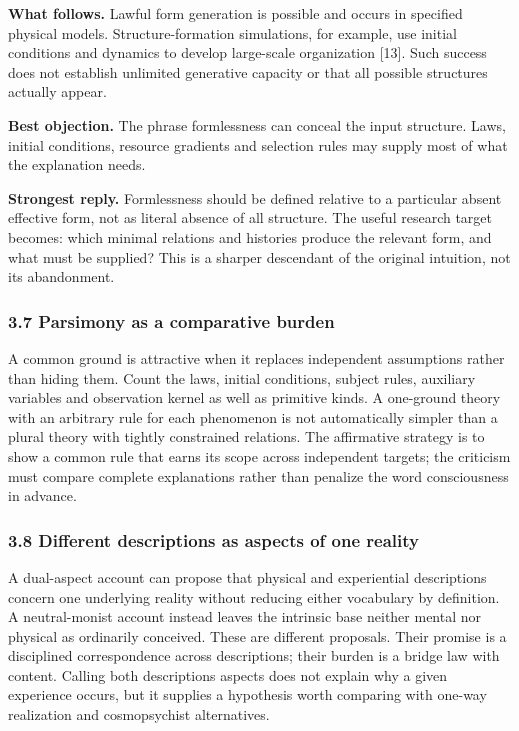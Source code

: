 \documentclass[
  10pt,
  a4paper,
]{article}
\begin{document}
\textbf{What follows.} Lawful form generation is possible and occurs in
specified physical models. Structure-formation simulations, for example,
use initial conditions and dynamics to develop large-scale organization
{[}13{]}. Such success does not establish unlimited generative capacity
or that all possible structures actually appear.

\textbf{Best objection.} The phrase formlessness can conceal the input
structure. Laws, initial conditions, resource gradients and selection
rules may supply most of what the explanation needs.

\textbf{Strongest reply.} Formlessness should be defined relative to a
particular absent effective form, not as literal absence of all
structure. The useful research target becomes: which minimal relations
and histories produce the relevant form, and what must be supplied? This
is a sharper descendant of the original intuition, not its abandonment.

\subsubsection{3.7 Parsimony as a comparative
burden}\label{parsimony-as-a-comparative-burden}

A common ground is attractive when it replaces independent assumptions
rather than hiding them. Count the laws, initial conditions, subject
rules, auxiliary variables and observation kernel as well as primitive
kinds. A one-ground theory with an arbitrary rule for each phenomenon is
not automatically simpler than a plural theory with tightly constrained
relations. The affirmative strategy is to show a common rule that earns
its scope across independent targets; the criticism must compare
complete explanations rather than penalize the word consciousness in
advance.

\subsubsection{3.8 Different descriptions as aspects of one
reality}\label{different-descriptions-as-aspects-of-one-reality}

A dual-aspect account can propose that physical and experiential
descriptions concern one underlying reality without reducing either
vocabulary by definition. A neutral-monist account instead leaves the
intrinsic base neither mental nor physical as ordinarily conceived.
These are different proposals. Their promise is a disciplined
correspondence across descriptions; their burden is a bridge law with
content. Calling both descriptions aspects does not explain why a given
experience occurs, but it supplies a hypothesis worth comparing with
one-way realization and cosmopsychist alternatives.
\end{document}
